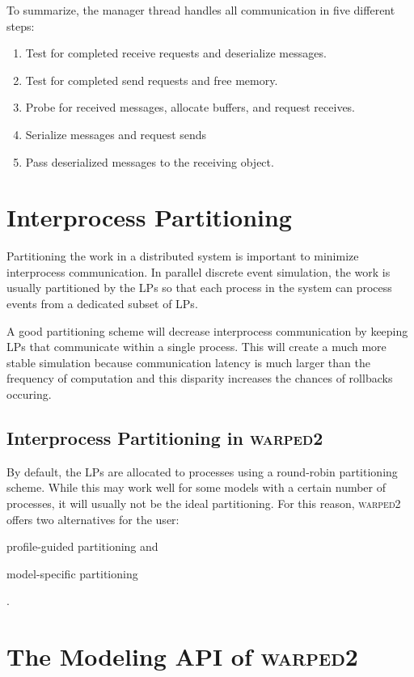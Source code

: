 \documentclass[11pt]{book}
\begin{document}
To summarize, the manager thread handles all communication in five different steps:
\begin{enumerate}
    \item Test for completed receive requests and deserialize messages.
    \item Test for completed send requests and free memory.
    \item Probe for received messages, allocate buffers, and request receives.
    \item Serialize messages and request sends
    \item Pass deserialized messages to the receiving object.
\end{enumerate}

\section{Interprocess Partitioning}

Partitioning the work in a distributed system is important to minimize interprocess
communication. In parallel discrete event simulation, the work is usually partitioned by
the LPs so that each process in the system can process events from a dedicated subset of LPs.

A good partitioning scheme will decrease interprocess communication by keeping LPs that communicate
within a single process. This will create a much more stable simulation because communication
latency is much larger than the frequency of computation and this disparity increases the chances
of rollbacks occuring.

\subsection{Interprocess Partitioning in \textsc{warped2}}

By default, the LPs are allocated to processes using a round-robin partitioning scheme. While
this may work well for some models with a certain number of processes, it will usually not
be the ideal partitioning. For this reason, \textsc{warped2} offers two alternatives for the
user: \begin{inparaenum} \item profile-guided partitioning and \item model-specific partitioning
\end{inparaenum}. 

\section{The Modeling API of \textsc{warped2}}
\end{document}
